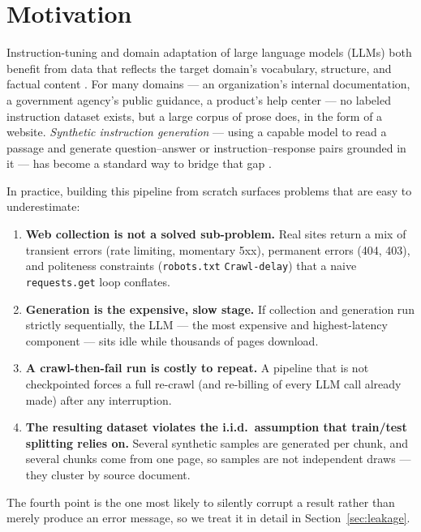 \documentclass[11pt]{article}
\begin{document}
\tableofcontents

\section{Motivation}

Instruction-tuning and domain adaptation of large language models (LLMs)
both benefit from data that reflects the target domain's vocabulary,
structure, and factual content \cite{wei2022finetuned, ouyang2022training}.
For many domains --- an organization's internal documentation, a
government agency's public guidance, a product's help center --- no
labeled instruction dataset exists, but a large corpus of prose does, in
the form of a website. \emph{Synthetic instruction generation} --- using
a capable model to read a passage and generate question--answer or
instruction--response pairs grounded in it --- has become a standard way
to bridge that gap \cite{wang2023selfinstruct, taori2023alpaca,
xu2023wizardlm}.

In practice, building this pipeline from scratch surfaces problems that
are easy to underestimate:

\begin{enumerate}[leftmargin=1.5em]
  \item \textbf{Web collection is not a solved sub-problem.} Real sites
    return a mix of transient errors (rate limiting, momentary 5xx),
    permanent errors (404, 403), and politeness constraints
    (\texttt{robots.txt} \texttt{Crawl-delay}) that a naive
    \texttt{requests.get} loop conflates.
  \item \textbf{Generation is the expensive, slow stage.} If collection
    and generation run strictly sequentially, the LLM --- the most
    expensive and highest-latency component --- sits idle while
    thousands of pages download.
  \item \textbf{A crawl-then-fail run is costly to repeat.} A pipeline
    that is not checkpointed forces a full re-crawl (and re-billing of
    every LLM call already made) after any interruption.
  \item \textbf{The resulting dataset violates the i.i.d.\ assumption
    that train/test splitting relies on.} Several synthetic samples are
    generated per chunk, and several chunks come from one page, so
    samples are not independent draws --- they cluster by source
    document.
\end{enumerate}

The fourth point is the one most likely to silently corrupt a result
rather than merely produce an error message, so we treat it in detail
in Section~\ref{sec:leakage}.
\end{document}
